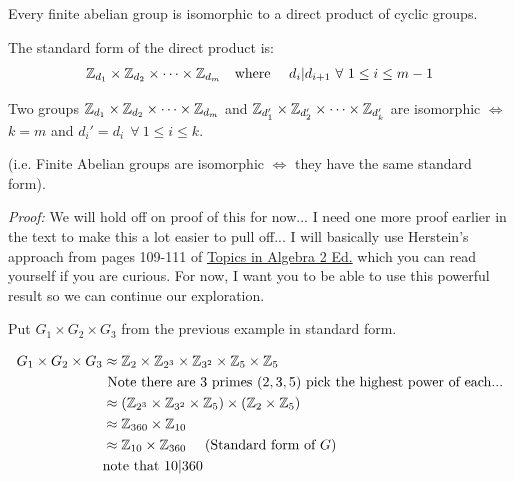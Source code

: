 \begin{theorem}
Every finite abelian group is isomorphic to a direct product of cyclic groups. \steezybreak

\noindent The standard form of the direct product is:
\begin{align}
    {\mathbb{Z}}_{d_1}\times {\mathbb{Z}}_{d_2}\times\cdots \times {\mathbb{Z}}_{d_m} \ \ \text{ where }\ \ \ d_i|d_{i+1} \ \forall \ 1\leq i \leq m-1 \nonumber
\end{align} \steezybreak

\noindent Two groups ${\mathbb{Z}}_{d_1}\times {\mathbb{Z}}_{d_2}\times \cdots \times {\mathbb{Z}}_{d_m}$ and
${\mathbb{Z}}_{d_1'}\times {\mathbb{Z}}_{d_2'}\times \cdots \times {\mathbb{Z}}_{d_k'}$ are isomorphic $\iff$ $k=m$ and
$d_i'=d_i \ \ \forall \ 1\leq i\leq k$. \steezybreak

\noindent (i.e. Finite Abelian groups are isomorphic $\iff$ they have the same standard form).
\steezybreak

\noindent \textit{Proof:} We will hold off on proof of this for now... I need one more proof earlier
in the text to make this a lot easier to pull off... I will basically use Herstein's approach from
pages 109-111 of
\href{https://marinazahara22.files.wordpress.com/2013/10/i-n-herstein-topics-in-algebra-2nd-edition-1975-wiley-international-editions-john-wiley-and-sons-wie-1975.pdf}{Topics
in Algebra 2 Ed.} which you can read yourself if you are curious. For now, I want you to be able to
use this powerful result so we can continue our exploration.
\end{theorem}
\newpage
\begin{example}
Put $G_1\times G_2\times G_3$ from the previous example in standard form.

\begin{align}
    G_1\times G_2\times G_3 &\approx \Z_2\times \Z_{2^3}\times \Z_{3^2}\times \Z_{5}\times \Z_5 \nonumber \\
    & \text{ Note there are 3 primes }(2,3,5)\text{ pick the highest power of each...} \nonumber \\
    &\approx (\Z_{2^3}\times \Z_{3^2}\times \Z_5)\times (\Z_2\times \Z_5) \nonumber \\
    &\approx \Z_{360}\times \Z_{10} \nonumber \\
    &\approx \Z_{10}\times \Z_{360} \nonumber \ \ \ \ \text{(Standard form of }G ) \\
    &\nonumber \text{note that }10|360
\end{align}
\end{example}


